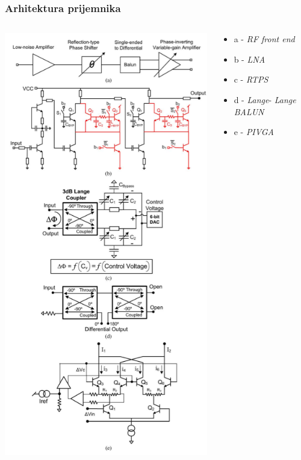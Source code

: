 \documentclass{beamer}
\begin{document}
\begin{frame}
  \frametitle{Arhitektura prijemnika}
  
   \begin{columns}
  \begin{column}{0.5\textwidth}
    \includegraphics[width=0.75\linewidth]{sch-RF-fe.png}
  \end{column}
  \begin{column}{0.5\textwidth}
    \begin{itemize}
      \item a - \textit{RF front end}
      \item b - \textit{LNA}
      \item c - \textit{RTPS}
      \item d - \textit{Lange}- \textit{Lange} \textit{BALUN}
      \item e - \textit{PIVGA}
    \end{itemize}
  \end{column}
  \end{columns}
\end{frame}
\end{document}

